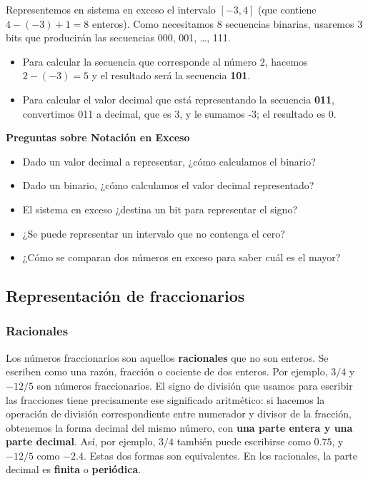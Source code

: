 \documentclass[spanish,A4,]{article}
\begin{document}
Representemos en sistema en exceso el intervalo $[-3, 4]$ (que contiene
$4 -(-3) + 1 = 8$ enteros). Como necesitamos 8 secuencias binarias,
usaremos 3 bits que producirán las secuencias 000, 001, \ldots{}, 111.

\begin{itemize}
\itemsep1pt\parskip0pt
\item
  Para calcular la secuencia que corresponde al número 2, hacemos
  $2 -(-3) = 5$ y el resultado será la secuencia \textbf{101}.
\item
  Para calcular el valor decimal que está representando la secuencia
  \textbf{011}, convertimos 011 a decimal, que es 3, y le sumamos -3; el
  resultado es $0$.
\end{itemize}

\textbf{Preguntas sobre Notación en Exceso}

\begin{itemize}
\itemsep1pt\parskip0pt
\item
  Dado un valor decimal a representar, ¿cómo calculamos el binario?
\item
  Dado un binario, ¿cómo calculamos el valor decimal representado?
\item
  El sistema en exceso ¿destina un bit para representar el signo?
\item
  ¿Se puede representar un intervalo que no contenga el cero?
\item
  ¿Cómo se comparan dos números en exceso para saber cuál es el mayor?
\end{itemize}

\subsection{Representación de
fraccionarios}\label{representaciuxf3n-de-fraccionarios}

\subsubsection{Racionales}\label{racionales}

Los números fraccionarios son aquellos \textbf{racionales} que no son
enteros. Se escriben como una razón, fracción o cociente de dos enteros.
Por ejemplo, $3/4$ y $-12/5$ son números fraccionarios. El signo de
división que usamos para escribir las fracciones tiene precisamente ese
significado aritmético: si hacemos la operación de división
correspondiente entre numerador y divisor de la fracción, obtenemos la
forma decimal del mismo número, con \textbf{una parte entera y una parte
decimal}. Así, por ejemplo, $3/4$ también puede escribirse como $0.75$,
y $-12/5$ como $-2.4$. Estas dos formas son equivalentes. En los
racionales, la parte decimal es \textbf{finita} o \textbf{periódica}.
\end{document}
